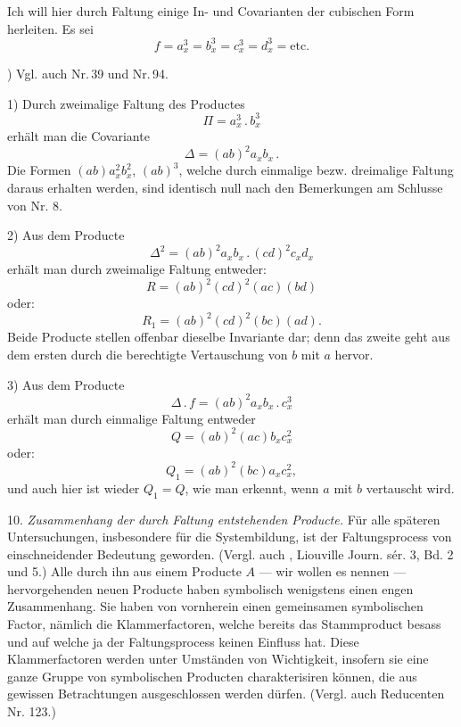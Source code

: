 Ich will hier durch Faltung einige In- und Covarianten der cubischen
Form herleiten. Es sei
\[
f = a_x^3 = b_x^3 = c_x^3 = d_x^3 = \text{etc.}
\]

\medskip
\noindent *) Vgl. auch Nr.\,39 und Nr.\,94.


1) Durch zweimalige Faltung des Productes
\[
\Pi = a_x^3 \,.\, b_x^3
\]
erhält man die Covariante
\[
\Delta = (ab)^2 a_x b_x \,.
\]
Die Formen $(ab) a_x^2 b_x^2$, $(ab)^3$, welche durch einmalige bezw.
dreimalige Faltung daraus erhalten werden, sind identisch null nach
den Bemerkungen am Schlusse von Nr. 8.

2) Aus dem Producte
\[
\Delta^2 = (ab)^2 a_x b_x \,.\, (cd)^2 c_x d_x
\]
erhält man durch zweimalige Faltung entweder:
\[
R = (ab)^2 (cd)^2 (ac) (bd)
\]
oder:
\[
R_1 = (ab)^2 (cd)^2 (bc) (ad) .
\]
Beide Producte stellen offenbar dieselbe Invariante dar; denn das
zweite geht aus dem ersten durch die berechtigte Vertauschung von $b$
mit $a$ hervor.

3) Aus dem Producte
\[
\Delta \,.\, f = (ab)^2 a_x b_x \,.\, c_x^3
\]
erhält man durch einmalige Faltung entweder
\[
Q = (ab)^2 (ac) b_x c_x^2
\]
oder:
\[
Q_1 = (ab)^2 (bc) a_x c_x^2 ,
\]
und auch hier ist wieder $Q_1 = Q$, wie man erkennt, wenn $a$ mit $b$
vertauscht wird.

10. \textit{Zusammenhang der durch Faltung entstehenden Producte.}
Für alle späteren Untersuchungen, insbesondere für die
Systembildung, ist der Faltungsprocess von einschneidender Bedeutung
geworden. (Vergl. auch , Liouville Journ.
sér. 3, Bd. 2 und 5.) Alle durch ihn aus einem Producte $A$ — wir
wollen es  nennen — hervorgehenden neuen
Producte haben symbolisch wenigstens einen engen Zusammenhang. Sie
haben von vornherein einen gemeinsamen symbolischen Factor, nämlich
die Klammerfactoren, welche bereits das Stammproduct besass und auf
welche ja der Faltungsprocess keinen Einfluss hat. Diese
Klammerfactoren werden unter Umständen von Wichtigkeit, insofern sie
eine ganze Gruppe von symbolischen Producten charakterisiren können,
die aus gewissen Betrachtungen ausgeschlossen werden dürfen. (Vergl.
auch \glqq Reducenten\grqq{} Nr. 123.)


